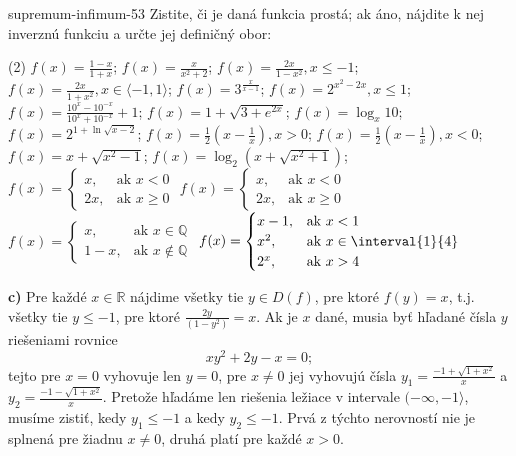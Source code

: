 \begin{defproblem}{supremum-infimum-53}
Zistite, či je daná funkcia prostá; ak áno, nájdite k nej inverznú funkciu a
určte jej definičný obor:
\begin{tasks}(2)
  \task $f(x)=\frac{1-x}{1+x}$;
  \task $f(x)=\frac{x}{x^2+2}$;
  \task $f(x)=\frac{2x}{1-x^2},x\leq -1$;
  \task $f(x)=\frac{2x}{1+x^2},x\in\langle -1,1\rangle$;
  \task $f(x)=3^{\frac{x}{x-1}}$;
  \task $f(x)=2^{x^2-2x},x\leq 1$;
  \task $f(x)=\frac{10^x-10^{-x}}{10^x+10^{-x}}+1$;
  \task $f(x)=1+\sqrt{3+e^{2x}}$;
  \task $f(x)=\log_x 10$;
  \task $f(x)=2^{1+\ln\sqrt{x-2}}$;
  \task $f(x)=\frac{1}{2}(x-\frac{1}{x}),x>0$;
  \task $f(x)=\frac{1}{2}(x-\frac{1}{x}),x<0$;
  \task $f(x)=x+\sqrt{x^2-1}$;
  \task $f(x)=\log_2 (x+\sqrt{x^2+1})$;
  \task
    $f(x)=
      \begin{cases}
        x,  & \text{ak } x < 0 \\
        2x, & \text{ak } x \geq 0
      \end{cases}
    $
  \task
    $f(x)=
      \begin{cases}
        x,  & \text{ak } x < 0 \\
        2x, & \text{ak } x \geq 0
      \end{cases}
    $
  \task
    $f(x)=
      \begin{cases}
        x,   & \text{ak } x \in \mathbb{Q} \\
        1-x, & \text{ak } x \notin \mathbb{Q}
      \end{cases}
    $
  \task
    $f(x)=
      \begin{cases}
        x-1, & \text{ak } x < 1 \\
        x^2, & \text{ak } x \in \interval{1}{4} \\
        2^x, & \text{ak } x > 4
      \end{cases}
    $
\end{tasks}

\begin{solution}
  \textbf{c)}
  Pre každé $x \in \mathbb{R}$ nájdime všetky tie $y \in D(f)$, pre ktoré $f(y)
  = x$, t.j. všetky tie $y \leq -1$, pre ktoré $\frac{2y}{(1-y^2)} = x$. Ak je
  $x$ dané, musia byť hľadané čísla $y$ riešeniami rovnice $$xy^2+2y-x=0;$$
  tejto pre $x=0$ vyhovuje len $y=0$, pre $x\neq 0$ jej vyhovujú čísla
  $y_1=\frac{-1+\sqrt{1+x^2}}{x}$ a $y_2=\frac{-1-\sqrt{1+x^2}}{x}$. Pretože
  hľadáme len riešenia ležiace v intervale $(-\infty,-1\rangle$, musíme zistiť,
  kedy $y_1\leq -1$ a kedy $y_2\leq -1$. Prvá z týchto nerovností nie je splnená
  pre žiadnu $x\neq 0$, druhá platí pre každé $x>0$.
\end{solution}
\end{defproblem}

